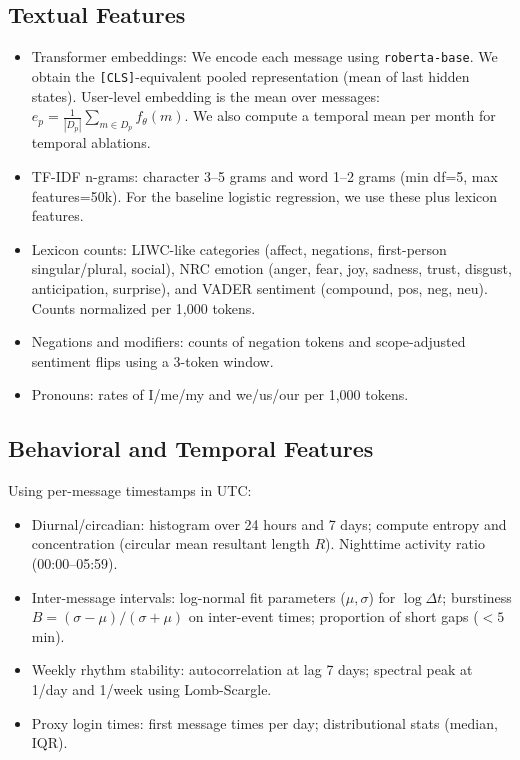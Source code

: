 \subsection{Textual Features}
\begin{itemize}
  \item Transformer embeddings: We encode each message using \texttt{roberta-base}. We obtain the \verb|[CLS]|-equivalent pooled representation (mean of last hidden states). User-level embedding is the mean over messages: \(e_p = \frac{1}{|D_p|}\sum_{m \in D_p} f_\theta(m)\). We also compute a temporal mean per month for temporal ablations.
  \item TF-IDF n-grams: character 3--5 grams and word 1--2 grams (min df=5, max features=50k). For the baseline logistic regression, we use these plus lexicon features.
  \item Lexicon counts: LIWC-like categories (affect, negations, first-person singular/plural, social), NRC emotion (anger, fear, joy, sadness, trust, disgust, anticipation, surprise), and VADER sentiment (compound, pos, neg, neu). Counts normalized per 1,000 tokens.
  \item Negations and modifiers: counts of negation tokens and scope-adjusted sentiment flips using a 3-token window.
  \item Pronouns: rates of I/me/my and we/us/our per 1,000 tokens.
\end{itemize}

\subsection{Behavioral and Temporal Features}
Using per-message timestamps in UTC:
\begin{itemize}
  \item Diurnal/circadian: histogram over 24 hours and 7 days; compute entropy and concentration (circular mean resultant length \(R\)). Nighttime activity ratio (00:00--05:59).
  \item Inter-message intervals: log-normal fit parameters (\(\mu, \sigma\)) for \(\log \Delta t\); burstiness \(B = (\sigma - \mu)/(\sigma + \mu)\) on inter-event times; proportion of short gaps (\(<5\) min).
  \item Weekly rhythm stability: autocorrelation at lag 7 days; spectral peak at 1/day and 1/week using Lomb-Scargle.
  \item Proxy login times: first message times per day; distributional stats (median, IQR).
\end{itemize}

